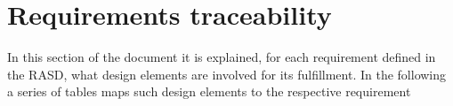 \chapter{Requirements traceability}
In this section of the document it is explained, for each requirement defined in the RASD,
what design elements are involved for its fulfillment. In the following a series of tables maps
such design elements to the respective requirement